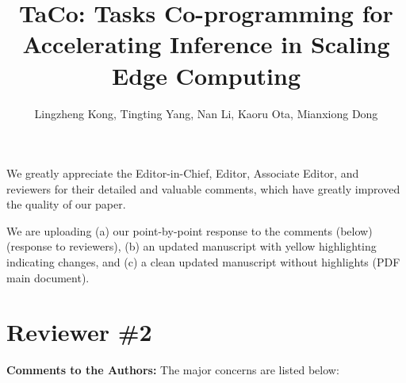 \documentclass{ar2rc}
\title{TaCo: Tasks Co-programming for Accelerating Inference in Scaling Edge Computing}
\author{Lingzheng Kong, Tingting Yang, Nan Li, Kaoru Ota, Mianxiong Dong}
\begin{document}
\maketitle




We greatly appreciate the Editor-in-Chief, Editor, Associate Editor, and reviewers for their detailed and valuable comments, which have greatly improved the quality of our paper. 

We are uploading (a) our point-by-point response to the comments (below) (response to reviewers), (b) an updated manuscript with yellow highlighting indicating changes, and (c) a clean updated manuscript without highlights (PDF main document).



\section{Reviewer \#2}
\textbf{Comments to the Authors:} The major concerns are listed below:
\end{document}
